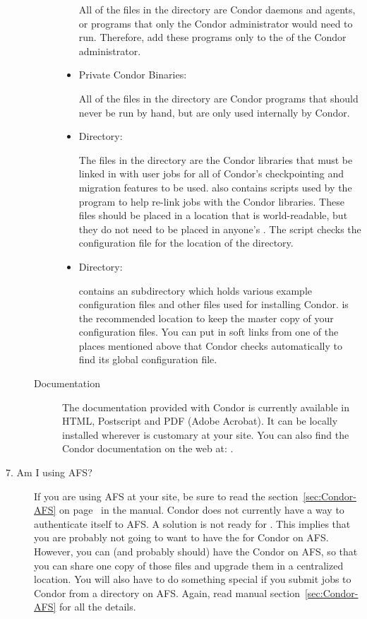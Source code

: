 \begin{description}
\begin{description}
\begin{itemize}
     All of the files in the  directory are Condor daemons and
     agents, or programs that only the Condor administrator would need
     to run.  Therefore, add these programs only
     to the  of the Condor administrator.

     \item Private Condor Binaries:

     All of the files in the  directory are Condor
     programs that should never be run by hand, but are only used
     internally by Condor. 

     \item {} Directory:

     The files in the  directory are the Condor libraries that
     must be linked in with user jobs for all of Condor's
     checkpointing and migration features to be used.   also
     contains scripts used by the  program to help
     re-link jobs with the Condor libraries.  These files should be
     placed in a location that is world-readable, but they do not need
     to be placed in anyone's .  The  script checks
     the configuration file for the location of the  directory.

     \item {} Directory:

      contains an  subdirectory which holds various
     example configuration files and other files used for installing Condor.
      is the recommended location to keep the master copy of your
     configuration files.  You can put in soft links from one of the places
     mentioned above that Condor checks automatically to find its
     global configuration file. 
\end{itemize}

\item[Documentation]

The documentation provided with Condor is currently available in
     HTML, Postscript and PDF (Adobe Acrobat).  It can be locally installed
     wherever is customary at your site.  You can also find the Condor
     documentation on the web at:
     .

\end{description}

\item[7. Am I using AFS?]

If you are using AFS at your site, be sure to read the
section~\ref{sec:Condor-AFS} on page~\pageref{sec:Condor-AFS} in the
manual.
Condor does not currently have a way to authenticate itself to AFS.
A solution is not ready for
\VersionNotice.
This implies that you are probably not going to want
to have the  for Condor on AFS.
However, you can
(and probably should) have the Condor  on AFS, so
that you can share one copy of those files and upgrade them in a
centralized location.  You will also have to do something special if
you submit jobs to Condor from a directory on AFS.  Again, read manual
section~\ref{sec:Condor-AFS} for all the details.


\end{description}
